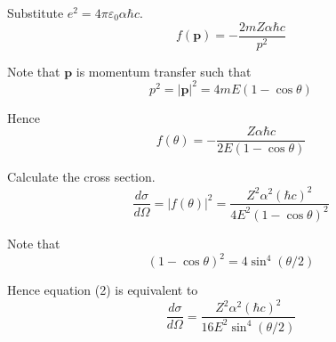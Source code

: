 Substitute $e^2=4\pi\varepsilon_0\alpha\hbar c$.
\begin{equation*}
f(\mathbf p)=-\frac{2mZ\alpha\hbar c}{p^2}
\end{equation*}

Note that $\mathbf p$ is momentum transfer such that
\begin{equation*}
p^2=|\mathbf p|^2=4mE(1-\cos\theta)
\end{equation*}

Hence
\begin{equation*}
f(\theta)=-\frac{Z\alpha\hbar c}{2E(1-\cos\theta)}
\end{equation*}

Calculate the cross section.
\begin{equation*}
\frac{d\sigma}{d\Omega}=|f(\theta)|^2
=\frac{Z^2\alpha^2(\hbar c)^2}{4E^2(1-\cos\theta)^2}
\tag{2}
\end{equation*}

Note that
\begin{equation*}
(1-\cos\theta)^2=4\sin^4(\theta/2)
\end{equation*}

Hence equation (2) is equivalent to
\begin{equation*}
\frac{d\sigma}{d\Omega}=\frac{Z^2\alpha^2(\hbar c)^2}{16E^2\sin^4(\theta/2)}
\tag{3}
\end{equation*}


